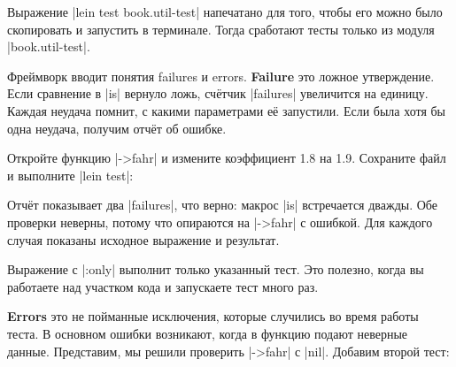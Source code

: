 
Выражение \spverb|lein test book.util-test| напечатано для того, чтобы его можно
было скопировать и запустить в терминале. Тогда сработают тесты только из модуля
\spverb|book.util-test|.

Фреймворк вводит понятия failures и errors. \textbf{Failure}  это
ложное утверждение. Если сравнение в \spverb|is| вернуло ложь, сч\"{е}тчик
\spverb|failures| увеличится на единицу. Каждая неудача помнит, с какими
параметрами е\"{е} запустили. Если была хотя бы одна неудача, получим отч\"{е}т об
ошибке.

Откройте функцию \spverb|->fahr| и измените коэффициент 1.8 на 1.9. Сохраните
файл и выполните \spverb|lein test|:

\begin{english}
\end{english}

Отч\"{е}т показывает два \spverb|failures|, что верно: макрос \spverb|is|
встречается дважды. Обе проверки неверны, потому что опираются на
\spverb|->fahr| с ошибкой. Для каждого случая показаны исходное выражение и
результат.

Выражение с \spverb|:only| выполнит только указанный тест. Это полезно, когда вы
работаете над участком кода и запускаете тест много раз.

\begin{english}
\end{english}


\textbf{Errors} это не пойманные исключения, которые случились во время работы
теста. В основном ошибки возникают, когда в функцию подают неверные
данные. Представим, мы решили проверить \spverb|->fahr| с \spverb|nil|. Добавим
второй тест:

